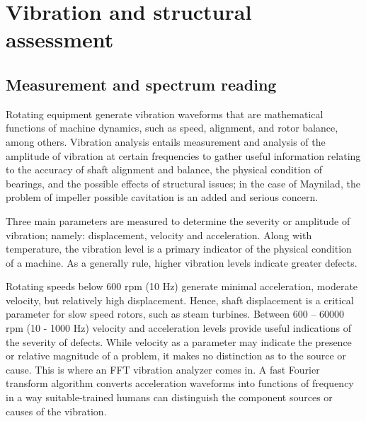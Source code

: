 %



\section{Vibration and structural assessment}
\label{45}
\subsection{Measurement and spectrum reading}
Rotating equipment generate vibration waveforms that are mathematical functions of machine dynamics, such as speed, alignment, and rotor balance, among others. Vibration analysis entails measurement and analysis of the amplitude of vibration at certain frequencies to gather useful information relating to the accuracy of shaft alignment and balance, the physical condition of bearings, and the possible effects of structural issues; in the case of Maynilad, the problem of impeller possible cavitation is an added and serious concern.

Three main parameters are measured to determine the severity or amplitude of vibration; namely: displacement, velocity and acceleration. Along with temperature, the vibration level is a primary indicator of the physical condition of a machine. As a generally rule, higher vibration levels indicate greater defects. 

Rotating speeds below 600 rpm (10 Hz) generate minimal acceleration, moderate velocity, but relatively high displacement. Hence, shaft displacement is a critical parameter for slow speed rotors, such as steam turbines. Between 600 – 60000 rpm (10 - 1000 Hz) velocity and acceleration levels provide useful indications of the severity of defects. While velocity as a parameter may indicate the presence or relative magnitude of a problem, it makes no distinction as to the source or cause. This is where an FFT vibration analyzer comes in. A fast Fourier transform algorithm converts acceleration waveforms into functions of frequency in a way suitable-trained humans can distinguish the component sources or causes of the vibration.

